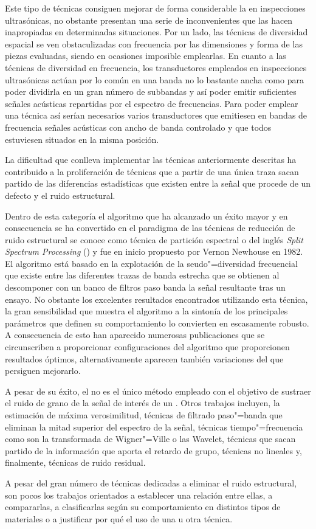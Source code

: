 Este tipo de técnicas consiguen mejorar de forma considerable la  en inspecciones ultrasónicas, no obstante presentan una serie de inconvenientes que las hacen inapropiadas en determinadas situaciones. Por un lado, las técnicas de diversidad espacial se ven obstaculizadas con frecuencia por las dimensiones y forma de las piezas evaluadas, siendo en ocasiones imposible emplearlas. En cuanto a las técnicas de diversidad en frecuencia, los transductores empleados en inspecciones ultrasónicas actúan por lo común en una banda no lo bastante ancha como para poder dividirla en un gran número de subbandas y así poder emitir suficientes señales acústicas repartidas por el espectro de frecuencias. Para poder emplear una técnica así serían necesarios varios transductores que emitiesen en bandas de frecuencia señales acústicas con ancho de banda controlado y que todos estuviesen situados en la misma posición.\par
La dificultad que conlleva implementar las técnicas anteriormente descritas ha contribuido a la proliferación de técnicas que a partir de una única traza sacan partido de las diferencias estadísticas que existen entre la señal que procede de un defecto y el ruido estructural.\par
Dentro de esta categoría el algoritmo que ha alcanzado un éxito mayor y en consecuencia se ha convertido en el paradigma de las técnicas de reducción de ruido estructural se conoce como técnica de partición espectral o del inglés \emph{Split Spectrum Processing} () y fue en inicio propuesto por Vernon Newhouse en 1982. El algoritmo está basado en la explotación de la seudo"=diversidad frecuencial que existe entre las diferentes trazas de banda estrecha que se obtienen al descomponer con un banco de filtros paso banda la señal resultante tras un ensayo. No obstante los excelentes resultados encontrados utilizando esta técnica, la gran sensibilidad que muestra el algoritmo a la sintonía de los principales parámetros que definen su comportamiento lo convierten en escasamente robusto. A consecuencia de esto han aparecido numerosas publicaciones que se circunscriben a proporcionar configuraciones del algoritmo que proporcionen resultados óptimos, alternativamente aparecen también variaciones del  que persiguen mejorarlo.\par
A pesar de su éxito, el  no es el único método empleado con el objetivo de sustraer el ruido de grano de la señal de interés de un . Otros trabajos incluyen, la estimación de máxima verosimilitud, técnicas de filtrado paso"=banda que eliminan la mitad superior del espectro de la señal, técnicas tiempo"=frecuencia como son la transformada de Wigner"=Ville o las Wavelet, técnicas que sacan partido de la información que aporta el retardo de grupo, técnicas no lineales y, finalmente, técnicas de ruido residual.\par
A pesar del gran número de técnicas dedicadas a eliminar el ruido estructural, son pocos los trabajos orientados a establecer una relación entre ellas, a compararlas, a clasificarlas según su comportamiento en distintos tipos de materiales o a justificar por qué el uso de una u otra técnica.


